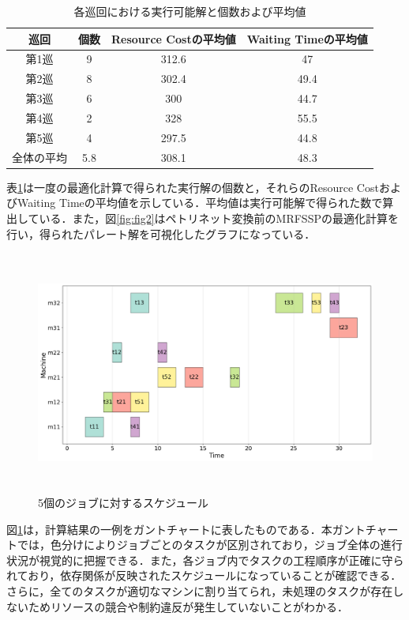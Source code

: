 \begin{table}[ht]
    \centering
    \vspace{-0.3cm}
    \caption{各巡回における実行可能解と個数および平均値}
    \begin{tabular}{|c|c|c|c|}
        \hline
         巡回 & 個数 & Resource Costの平均値 & Waiting Timeの平均値 \\
        \hline
        第1巡 & 9 & 312.6 & 47 \\
        \hline
        第2巡 & 8 & 302.4 & 49.4 \\
        \hline
        第3巡 & 6 & 300 & 44.7\\
        \hline
        第4巡 & 2 & 328 & 55.5 \\
        \hline
        第5巡 & 4 & 297.5 & 44.8 \\
        \hline
        全体の平均 & 5.8 & 308.1 & 48.3 \\
        \hline
    \end{tabular}
    \label{tab:before_feasible}
\end{table}

表\ref{tab:before_feasible}は一度の最適化計算で得られた実行解の個数と，それらのResource CostおよびWaiting Timeの平均値を示している．平均値は実行可能解で得られた数で算出している．また，図\ref{fig:fig2}はペトリネット変換前のMRFSSPの最適化計算を行い，得られたパレート解を可視化したグラフになっている．

\begin{figure}[H]
    \centering
    \includegraphics[width=0.8\linewidth, height=8cm]{./images/gantt1_job5.png}
    \caption{5個のジョブに対するスケジュール}
    \label{fig:fig3}
\end{figure}

図\ref{fig:fig3}は，計算結果の一例をガントチャートに表したものである．本ガントチャートでは，色分けによりジョブごとのタスクが区別されており，ジョブ全体の進行状況が視覚的に把握できる．また，各ジョブ内でタスクの工程順序が正確に守られており，依存関係が反映されたスケジュールになっていることが確認できる．さらに，全てのタスクが適切なマシンに割り当てられ，未処理のタスクが存在しないためリソースの競合や制約違反が発生していないことがわかる．

